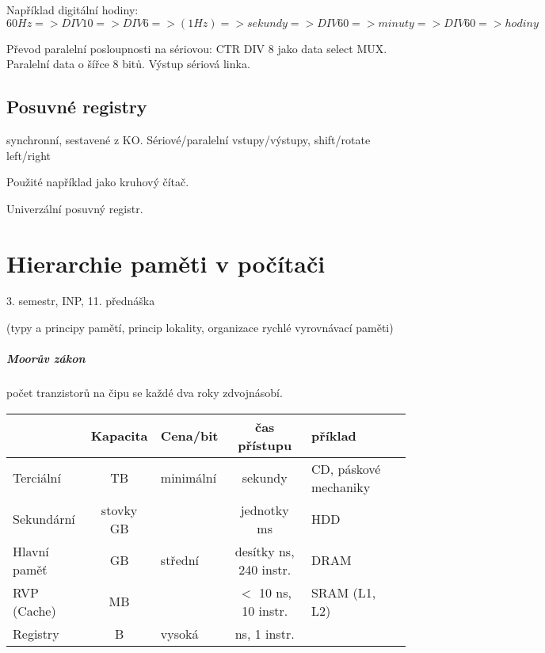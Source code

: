 \documentclass[a4paper, 11pt]{report}
\begin{document}
Například digitální hodiny: $60Hz => DIV 10 => DIV 6 => (1 Hz) => sekundy => DIV 60 => minuty => DIV 60 => hodiny$

Převod paralelní posloupnosti na sériovou: CTR DIV 8 jako data select MUX. Paralelní data o šířce 8 bitů. Výstup sériová linka.

\section{Posuvné registry}

synchronní, sestavené z KO. Sériové/paralelní vstupy/výstupy, shift/rotate left/right

Použité například jako kruhový čítač.

Univerzální posuvný registr.















\chapter{Hierarchie paměti v počítači} \label{cha:4}

3. semestr, INP, 11. přednáška

(typy a principy pamětí, princip lokality, organizace rychlé vyrovnávací paměti)

\paragraph{Moorův zákon} počet tranzistorů na čipu se každé dva roky zdvojnásobí.

\shorthandoff{-}
\begin{tabular}{| l || c | l | c | l | l |}
\hline
			& Kapacita	& Cena/bit	& čas přístupu			& příklad \\ \hline \hline
Terciální	& TB 		& minimální	& sekundy						& CD, páskové mechaniky \\ \cline{1-1}
Sekundární	& stovky GB	&	 		& jednotky ms			& HDD \\ \cline{1-1}
Hlavní paměť& GB		& střední	& desítky ns, 240 instr.& DRAM \\ \cline{1-1}
RVP (Cache) & MB		& 			& $<$ 10 ns, 10 instr.	& SRAM (L1, L2) \\ \cline{1-1}
Registry 	& B			& vysoká	& ns, 1 instr.	&  \\
\hline
\end{tabular}
\shorthandon{-}
\end{document}
